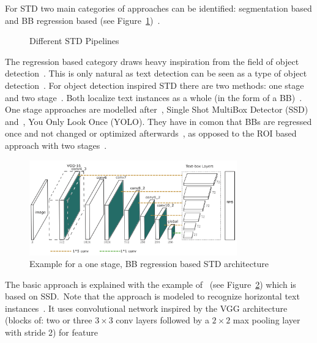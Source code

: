 For \ac{STD} two main categories of approaches can be identified: segmentation based and \ac{BB}
regression based (see
Figure~\ref{fig:STD-pipelines})~\citep{long_scene_2021,sheng_centripetaltext_2021,liu_accurate_2020}.
\begin{figure}[ht]
    \centering
    
    \caption{Different STD Pipelines\label{fig:STD-pipelines}}
\end{figure}
The regression based category draws heavy inspiration from the field of object
detection~\citep{long_scene_2021,liu_accurate_2020}.
This is only natural as text detection can be seen as a type of object
detection~\citep{liu_accurate_2020,long_scene_2021}.
For object detection inspired \ac{STD} there are two methods: one stage and two
stage~\citep{long_scene_2021}.
Both localize text instances as a whole (in the form of a
\ac{BB})~\citep{long_scene_2021,sheng_centripetaltext_2021}.
One stage approaches are modelled after~\cite{liu_ssd_2016}, Single Shot MultiBox
Detector (SSD) and~\cite{redmon_you_2016}, You Only Look Once (YOLO).
They have in comon that \acp{BB} are regressed once and not changed or optimized
afterwards~\citep{redmon_you_2016,liu_ssd_2016}, as opposed to the \ac{ROI} based approach with two
stages~\citep{girshick_rich_2014}.
\begin{figure}[ht]
    \centering
    \includegraphics[width=0.8\textwidth]{img/STD-seg-free-Liao-TextBoxes-2017.png}
    \caption[One stage, BB regression based STD architecture]{%
        Example for a one stage, BB regression based STD
        architecture~\citep{liao_textboxes_2017}\label{fig:STD-segfree-ssd}
    }
\end{figure}
The basic approach is explained with the example of~\cite{liao_textboxes_2017} (see
Figure~\ref{fig:STD-segfree-ssd}) which is based on SSD.\
Note that the approach is modeled to recognize horizontal text instances~\citep{liao_textboxes_2017}.
It uses convolutional network inspired by the VGG architecture (blocks of: two or
three $3\times3$ conv layers followed by a $2\times2$ max pooling layer with stride 2) for feature
